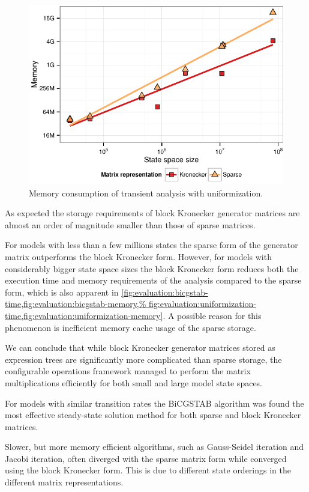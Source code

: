 \begin{figure}
  \centering
  \includegraphics{figures/Uniformization_matrix_memory}
  \caption{Memory consumption of transient analysis with
    uniformization.}
  \label{fig:evaluation:uniformization-memory}
\end{figure}

As expected the storage requirements of block Kronecker generator
matrices are almost an order of magnitude smaller than those of sparse
matrices.

For models with less than a few millions states the sparse form of the
generator matrix outperforms the block Kronecker form. However, for
models with considerably bigger state space sizes the block Kronecker
form reduces both the execution time and memory requirements of the
analysis compared to the sparse form, which is also apparent in
\cref{fig:evaluation:bicgstab-time,fig:evaluation:bicgstab-memory,%
  fig:evaluation:uniformization-time,fig:evaluation:uniformization-memory}.
A possible reason for this phenomenon is inefficient 
memory cache usage of the sparse storage.

We can conclude that while block Kronecker generator matrices stored
as expression trees are significantly more complicated than sparse
storage, the configurable operations framework managed to perform the
matrix multiplications efficiently for both small and large model
state spaces.

For models with similar transition rates the BiCGSTAB algorithm was
found the most effective steady-state solution method for both sparse
and block Kronecker matrices.

Slower, but more memory efficient algorithms, such as Gauss-Seidel
iteration and Jacobi iteration, often diverged with the sparse matrix
form while converged using the block Kronecker form. This is due to
different state orderings in the different matrix representations.

